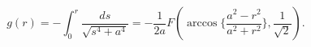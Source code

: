 \begin{equation}
g(r)= - \int^{r}_{0}{\frac{ds}{\sqrt{s^4+a^4}}}=- \frac{1}{2a}
F(\arccos{\{ \frac{a^2-r^2}{a^2+r^2}} \},\frac{1}{\sqrt{2}}).
\label{gDem}
\end{equation}


